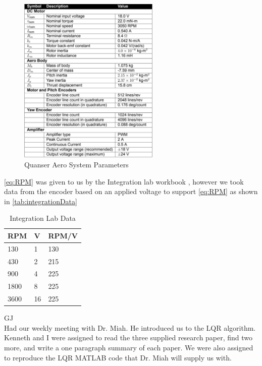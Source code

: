 \documentclass[fontsize=11pt, %
                             paper=letter, %
                             openany, %
                             captions=tableheading,
                             index=totoc,
                             hyperref]{labbook}
\begin{document}
\begin{addmargin}[0cm]{0cm}
\begin{figure}[h]
  \centering
  \includegraphics[width=0.6\textwidth]{figs/img/quanserAeroSystemParameters}
  \caption{Quanser Aero System Parameters}
  \label{fig:quanserAeroSystemParameters}
\end{figure}

\autoref{eq:RPM} was given to us by the Integration lab workbook \cite{aeroIntegrationWorkbook}, however we took data from the encoder based on an applied voltage to support \autoref{eq:RPM} as shown in \autoref{tab:integrationData}

\begin{table}[h!]
    \centering
    \begin{tabular}{l|l|l}
        \toprule
        \textbf{RPM} & \textbf{V} & \textbf{RPM/V}\\
        \toprule
        130 & 1 & 130\\
        430 & 2 & 215\\
        900 & 4 & 225\\
        1800 & 8 & 225\\
        3600 & 16 & 225\\
        \bottomrule
    \end{tabular}
    \caption{Integration Lab Data}
    \label{tab:integrationData}
\end{table}



GJ\\
Had our weekly meeting with Dr. Miah.  He introduced us to the LQR algorithm.  Kenneth and I were assigned to read the three supplied research paper, find two more, and write a one paragraph summary of each paper.  We were also assigned to reproduce the LQR MATLAB code that Dr. Miah will supply us with.


\end{addmargin}
\end{document}

